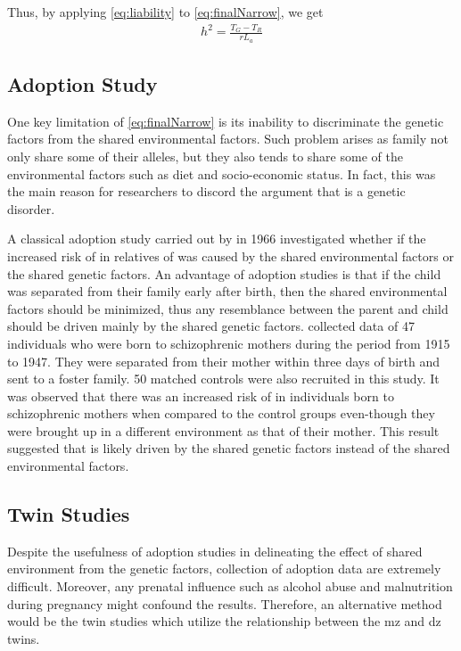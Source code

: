 \documentclass[12pt]{scrbook}
\newcommand*{\glng}{\glsentrylong}
\begin{document}
	Thus, by applying \cref{eq:liability} to \cref{eq:finalNarrow}, we get
	\begin{align}
	h^2 =\frac{T_G-T_R}{rL_a}
	\end{align}
	
	\subsection{Adoption Study}
	One key limitation of \cref{eq:finalNarrow} is its inability to discriminate the genetic factors from the shared environmental factors.
	Such problem arises as family not only share some of their alleles, but they also tends to share some of the environmental factors such as diet and socio-economic status. 
	In fact, this was the main reason for researchers to discord the argument that \glng{scz} is a genetic disorder.
	
	A classical adoption study carried out by \citet{HESTON1966} in 1966 investigated whether if the increased risk of \glng{scz} in relatives of \glng{scz} was caused by the shared environmental factors or the shared genetic factors. 
	An advantage of adoption studies is that if the child was separated from their family early after birth, then the shared environmental factors should be minimized, thus any resemblance between the parent and child should be driven mainly by the shared genetic factors.
	\citet{HESTON1966} collected data of 47 individuals who were born to schizophrenic mothers during the period from 1915 to 1947. 
	They were separated from their mother within three days of birth and sent to a foster family. 
	50 matched controls were also recruited in this study.
	It was observed that there was an increased risk of \glng{scz} in individuals born to schizophrenic mothers when compared to the control groups even-though they were brought up in a different environment as that of their mother.
	This result suggested that \glng{scz} is likely driven by the shared genetic factors instead of the shared environmental factors.
	
	\subsection{Twin Studies}
	Despite the usefulness of adoption studies in delineating the effect of shared environment from the genetic factors, collection of adoption data are extremely difficult. 
	Moreover, any prenatal influence such as alcohol abuse and malnutrition during pregnancy might confound the results.
	Therefore, an alternative method would be the twin studies which utilize the relationship between the \gls{mz} and \gls{dz} twins.
	
\end{document}
